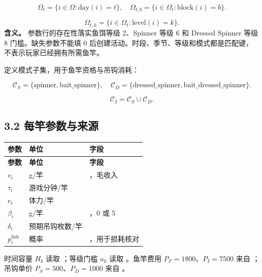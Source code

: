 \documentclass[11pt,a4paper]{article}
\begin{document}
\[
\Omega_t=\{i\in\Omega:\mathrm{day}(i)=t\},\quad
\Omega_{t,b}=\{i\in\Omega_t:\mathrm{block}(i)=b\}. \tag{D2}
\]

\begin{samepage}
\[
\Omega_{t,k}=\{i\in\Omega_t:\mathrm{level}(i)=k\}. \tag{D3}
\]
\textbf{含义。} 参数行的存在性落实鱼饵等级 2、Spinner 等级 6 和 Dressed Spinner 等级 8 门槛。缺失参数不能填 0 后创建活动。时段、季节、等级和模式都是匹配键， 不表示玩家已经拥有所需鱼竿。\par
\end{samepage}

定义模式子集，用于鱼竿资格与吊钩消耗：\par

\[
\mathcal C_S=\{\mathrm{spinner},\mathrm{bait\_spinner}\},\quad
\mathcal C_D=\{\mathrm{dressed\_spinner},\mathrm{bait\_dressed\_spinner}\}. \tag{D4}
\]

\[
\mathcal C_I=\mathcal C_S\cup\mathcal C_D. \tag{D5}
\]

\subsection*{3.2 每竿参数与来源}

{\small\begin{longtable}{L{0.17\dimexpr\textwidth-30pt\relax}L{0.2\dimexpr\textwidth-30pt\relax}L{0.63\dimexpr\textwidth-30pt\relax}}\toprule
\textbf{参数} & \textbf{单位} & \textbf{ 字段}\\\midrule\endfirsthead
\textbf{参数} & \textbf{单位} & \textbf{ 字段}\\\midrule\endhead
\bottomrule\endfoot
$v_i$ & g/竿 & ，毛收入\\
$\tau_i$ & 游戏分钟/竿 & \\
$e_i$ & 体力/竿 & \\
$\beta_i$ & g/竿 & ，0 或 5\\
$\delta_i$ & 预期吊钩枚数/竿 & \\
$p_i^{\mathrm{fish}}$ & 概率 & ，用于损耗核对\\
\end{longtable}}

时间容量 $H_b$ 读取 ；等级门槛 $a_k$ 读取 。鱼竿费用 $P_F=1800$、$P_I=7500$ 来自 ；吊钩单价 $P_S=500$、$P_D=1000$ 来自 。\par
\end{document}

